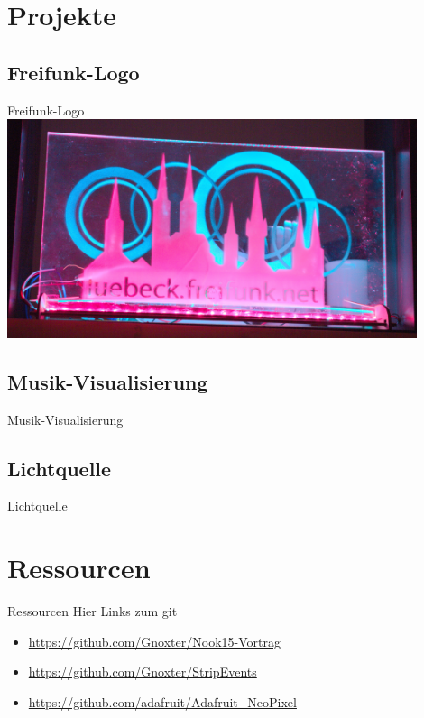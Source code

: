 \documentclass{beamer}
\begin{document}
\section{Projekte}
\subsection{Freifunk-Logo}
\begin{frame}{Freifunk-Logo}
 \centering
 \includegraphics[width=12cm,keepaspectratio=true]{./img/_MGL5102.jpg}
\end{frame}

\subsection{Musik-Visualisierung}
\begin{frame}{Musik-Visualisierung}
\end{frame}

\subsection{Lichtquelle}
\begin{frame}{Lichtquelle}
\end{frame}

\section{Ressourcen}
\begin{frame}{Ressourcen}
 Hier Links zum git
\begin{itemize}
 \item \url{https://github.com/Gnoxter/Nook15-Vortrag}
 \item \url{https://github.com/Gnoxter/StripEvents}
 \item \url{https://github.com/adafruit/Adafruit_NeoPixel}
\end{itemize}
\end{frame}
\end{document}
